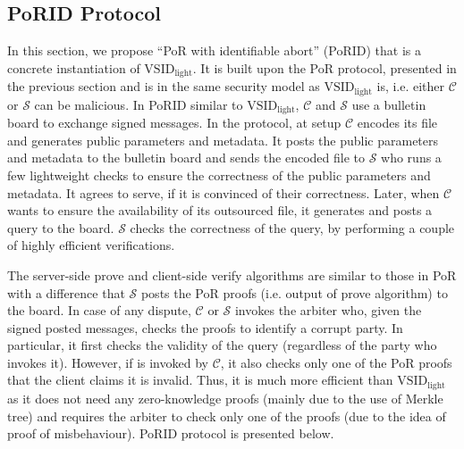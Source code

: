 

\subsection{PoRID Protocol}

In this section, we propose ``PoR with identifiable abort'' (PoRID) that is a concrete instantiation of $\text{VSID}_{\scriptscriptstyle\text{light}}$. It is built upon the PoR protocol, presented in the previous section and is in the same security model as $\text{VSID}_{\scriptscriptstyle\text{light}}$ is, i.e. either $\mathcal C$ or $\mathcal S$ can be malicious. In PoRID similar to $\text{VSID}_{\scriptscriptstyle\text{light}}$, $\mathcal C$ and $\mathcal S$ use a bulletin board to exchange signed messages.  In the protocol, at setup $\mathcal C$ encodes its file and generates public parameters and  metadata.  It posts the public parameters and metadata to the bulletin board and   sends the encoded file to $\mathcal S$ who runs a few lightweight checks to ensure the correctness of the public parameters and metadata. It agrees to serve, if it is convinced of their correctness. Later, when $\mathcal C$ wants to ensure the availability of its outsourced file, it  generates and posts a query  to the board.   $\mathcal S$  checks the correctness of the query, by performing a couple of highly efficient verifications. 

The server-side prove and client-side verify algorithms are similar to those in PoR with a difference that $\mathcal S$ posts the PoR proofs (i.e. output of prove algorithm) to the board. In  case of any dispute, $\mathcal C$ or $\mathcal S$ invokes the arbiter who, given the signed posted messages, checks the proofs  to identify a corrupt party. In particular,  it first checks the validity of the query (regardless of the party who invokes it). However, if  is invoked by  $\mathcal C$, it also checks  only one of the PoR proofs that the client claims it is invalid. Thus, it is much more efficient than $\text{VSID}_{\scriptscriptstyle\text{light}}$ as it does not need any zero-knowledge proofs (mainly due to the use of Merkle tree) and requires the  arbiter to check only one of the proofs (due  to the idea of proof of misbehaviour). PoRID protocol is presented below.





